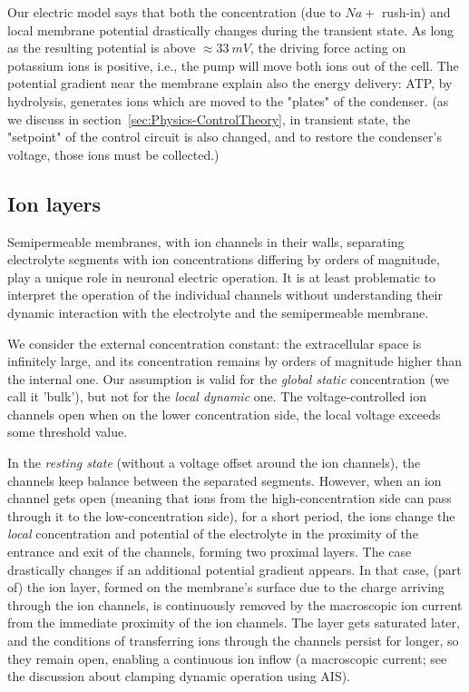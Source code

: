 Our electric model says that both the concentration (due to $Na+$ rush-in) and local membrane potential drastically changes
during the transient state. As long as the resulting potential is above
$\approx 33\ mV$, the driving force acting on potassium ions is
positive, i.e., the pump will move both ions out of the cell.
The potential gradient near the membrane explain also the energy delivery: \gls{ATP}, by hydrolysis, generates ions which are moved
to the "plates" of the condenser. (as we discuss in section~\ref{sec:Physics-ControlTheory}, in transient state,
the "setpoint" of the control circuit is also changed, and to restore the condenser's voltage, those ions must be collected.)


\subsection{Ion layers\label{sec:Single-IonLayers}}

Semipermeable membranes, with ion channels in their walls, separating electrolyte segments with ion concentrations differing by orders of magnitude,  play a unique role in neuronal electric operation.
It is at least problematic to interpret the operation of the individual channels without understanding their dynamic
interaction with the electrolyte and the semipermeable membrane. 

We consider the external concentration constant: the extracellular
space is infinitely large, and its concentration remains by orders
of magnitude higher than the internal one. Our assumption is valid for the \textit{global static} concentration (we call it 'bulk'), but not for the\textit{ local dynamic} one.
The voltage-controlled ion channels open when
on the lower concentration side, the local voltage exceeds some threshold value.

In the \textit{resting state} (without a voltage offset around the ion channels), the channels keep balance between the separated segments. 
However, when an ion channel gets open (meaning that ions from the high-concentration side can
pass through it to the low-concentration side), for a short period,
the ions change the \textit{local} concentration and potential of the electrolyte in the
proximity of the entrance and exit of the channels,
forming two proximal layers. 
The case drastically changes if an additional potential gradient appears.
In that case, (part of) the ion layer, formed on the
membrane's surface due to the charge arriving through the ion
channels, is  continuously removed by the macroscopic ion current from the immediate
proximity of the ion channels. The layer gets saturated later, and
the conditions of transferring ions
through the channels persist for longer, so they remain open, enabling a continuous
ion inflow (a macroscopic current; see the
discussion about  clamping dynamic operation using  \gls{AIS}).


